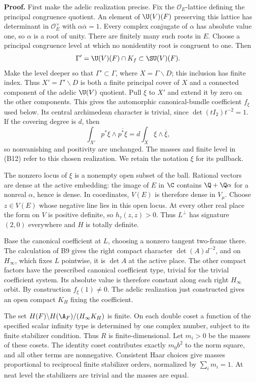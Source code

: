 \textbf{Proof.} First make the adelic realization precise. Fix the $\mathcal O_E$-lattice defining the principal congruence quotient. An element of $\U(V)(F)$ preserving this lattice has determinant in $\mathcal O_E^\times$ with $\alpha\overline\alpha=1$. Every complex conjugate of $\alpha$ has absolute value one, so $\alpha$ is a root of unity. There are finitely many such roots in $E$. Choose a principal congruence level at which no nonidentity root is congruent to one. Then
\[
 \Gamma'=\U(V)(F)\cap K_f\subset\SU(V)(F).
\]
Make the level deeper so that $\Gamma'\subset\Gamma$, where $X=\Gamma\backslash D$; this inclusion has finite index. Thus $X'=\Gamma'\backslash D$ is both a finite principal cover of $X$ and a connected component of the adelic $\U(V)$ quotient. Pull $\xi$ to $X'$ and extend it by zero on the other components. This gives the automorphic canonical-bundle coefficient $f_\xi$ used below. Its central archimedean character is trivial, since $\det(tI_2)t^{-2}=1$. If the covering degree is $d$, then
\[
 \int_{X'}p^*\xi\wedge\overline{p^*\xi}
       =d\int_X\xi\wedge\overline\xi,
\]
so nonvanishing and positivity are unchanged. The masses and finite level in (B12) refer to this chosen realization. We retain the notation $\xi$ for its pullback.

The nonzero locus of $\xi$ is a nonempty open subset of the ball. Rational vectors are dense at the active embedding: the image of $E$ in $\C$ contains $\Q+\Q\alpha$ for a nonreal $\alpha$, hence is dense. In coordinates, $V(E)$ is therefore dense in $V_\mu$. Choose $z\in V(E)$ whose negative line lies in this open locus. At every other real place the form on $V$ is positive definite, so $h_\tau(z,z)>0$. Thus $L^\perp$ has signature $(2,0)$ everywhere and $H$ is totally definite.

Base the canonical coefficient at $L$, choosing a nonzero tangent two-frame there. The calculation of B9 gives the right compact character $\det(A)d^{-2}$, and on $H_\infty$, which fixes $L$ pointwise, it is $\det A$ at the active place. The other compact factors have the prescribed canonical coefficient type, trivial for the trivial coefficient system. Its absolute value is therefore constant along each right $H_\infty$ orbit. By construction $f_\xi(1)\ne0$. The adelic realization just constructed gives an open compact $K_H$ fixing the coefficient.

The set $H(F)\backslash H(\A_F)/(H_\infty K_H)$ is finite. On each double coset a function of the specified scalar infinity type is determined by one complex number, subject to its finite stabilizer condition. Thus $R$ is finite-dimensional. Let $m_i>0$ be the masses of these cosets. The identity coset contributes exactly $m_0b^2$ to the norm square, and all other terms are nonnegative. Consistent Haar choices give masses proportional to reciprocal finite stabilizer orders, normalized by $\sum_i m_i=1$. At neat level the stabilizers are trivial and the masses are equal.

